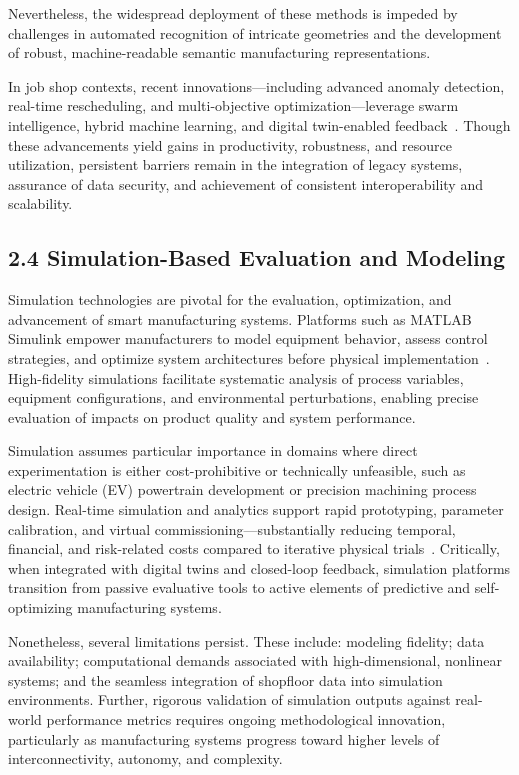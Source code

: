 \documentclass[11pt]{article}
\begin{document}
Nevertheless, the widespread deployment of these methods is impeded by challenges in automated recognition of intricate geometries and the development of robust, machine-readable semantic manufacturing representations.

In job shop contexts, recent innovations—including advanced anomaly detection, real-time rescheduling, and multi-objective optimization—leverage swarm intelligence, hybrid machine learning, and digital twin-enabled feedback~\cite{ref19,ref27,ref38,ref44}. Though these advancements yield gains in productivity, robustness, and resource utilization, persistent barriers remain in the integration of legacy systems, assurance of data security, and achievement of consistent interoperability and scalability.

\subsection{2.4 Simulation-Based Evaluation and Modeling}

Simulation technologies are pivotal for the evaluation, optimization, and advancement of smart manufacturing systems. Platforms such as MATLAB Simulink empower manufacturers to model equipment behavior, assess control strategies, and optimize system architectures before physical implementation~\cite{ref95}. High-fidelity simulations facilitate systematic analysis of process variables, equipment configurations, and environmental perturbations, enabling precise evaluation of impacts on product quality and system performance.

Simulation assumes particular importance in domains where direct experimentation is either cost-prohibitive or technically unfeasible, such as electric vehicle (EV) powertrain development or precision machining process design. Real-time simulation and analytics support rapid prototyping, parameter calibration, and virtual commissioning—substantially reducing temporal, financial, and risk-related costs compared to iterative physical trials~\cite{ref95}. Critically, when integrated with digital twins and closed-loop feedback, simulation platforms transition from passive evaluative tools to active elements of predictive and self-optimizing manufacturing systems.

Nonetheless, several limitations persist. These include: modeling fidelity; data availability; computational demands associated with high-dimensional, nonlinear systems; and the seamless integration of shopfloor data into simulation environments. Further, rigorous validation of simulation outputs against real-world performance metrics requires ongoing methodological innovation, particularly as manufacturing systems progress toward higher levels of interconnectivity, autonomy, and complexity.
\end{document}
